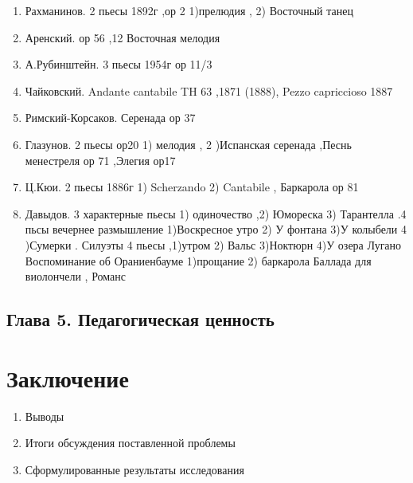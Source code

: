\documentclass[12pt,a4paper,oneside,titlepage,draft]{extreport}
\begin{document}
		\begin{enumerate}
\item Рахманинов. 2 пьесы 1892г ,ор 2 1)прелюдия , 2) Восточный танец 
\item Аренский. ор 56 ,12 Восточная мелодия 
\item А.Рубинштейн. 3 пьесы 1954г ор 11/3 
\item Чайковский. Andante cantabile TH 63 ,1871 (1888), Pezzo capriccioso 1887 
\item Римский-Корсаков. Серенада ор 37 
\item Глазунов. 2 пьесы ор20 1) мелодия , 2 )Испанская серенада ,Песнь менестреля ор 71 ,Элегия ор17 
\item Ц.Кюи. 2 пьесы 1886г 1) Scherzando 2) Cantabile , Баркарола ор 81 
\item Давыдов. 3 характерные пьесы 1) одиночество ,2) Юмореска 3) Тарантелла .4 пьсы вечернее размышление 1)Воскресное утро 2) У фонтана 3)У колыбели 4 )Сумерки . Силуэты 4 пьесы ,1)утром 2) Вальс 3)Ноктюрн 4)У озера Лугано 
Воспоминание об Ораниенбауме 1)прощание 2) баркарола 
Баллада для виолончели , Романс
\end{enumerate}

	\section*{Глава 5. Педагогическая ценность}
		
		
	
	\chapter*{Заключение}

	\begin{enumerate}
	\item Выводы
	\item Итоги обсуждения поставленной проблемы
	\item Сформулированные результаты исследования
	\end{enumerate}
	
	
	
	
	
	
	
\end{document}
